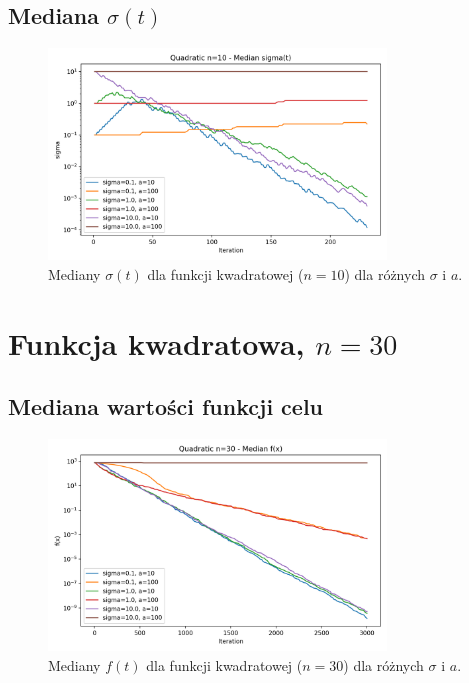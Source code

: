 \documentclass[a4paper,12pt]{article}
\begin{document}
\subsection{Mediana $\sigma(t)$}
\begin{figure}[H]
    \centering
    \includegraphics[width=0.8\textwidth]{charts/Quadratic_n10_all_sigmas.png}
    \caption{Mediany $\sigma(t)$ dla funkcji kwadratowej ($n=10$) dla różnych $\sigma$ i $a$.}
\end{figure}

\section{Funkcja kwadratowa, $n=30$}
\subsection{Mediana wartości funkcji celu}
\begin{figure}[H]
    \centering
    \includegraphics[width=0.8\textwidth]{charts/Quadratic_n30_all_medians.png}
    \caption{Mediany $f(t)$ dla funkcji kwadratowej ($n=30$) dla różnych $\sigma$ i $a$.}
\end{figure}
\end{document}
